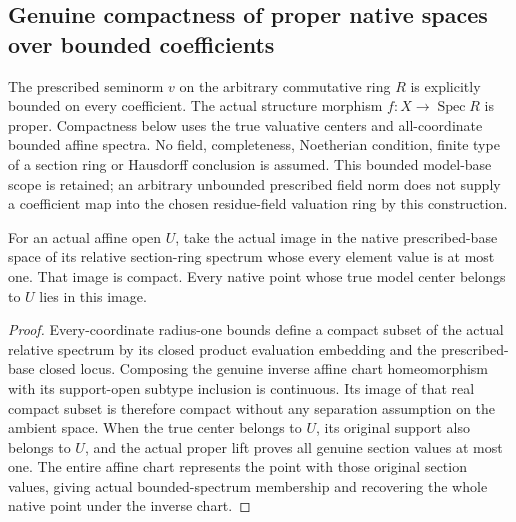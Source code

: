 \subsection{Genuine compactness of proper native spaces over bounded coefficients}
\label{subsec:proper-native-compactness}

The prescribed seminorm $v$ on the arbitrary commutative ring $R$ is
explicitly bounded on every coefficient. The actual structure morphism
$f:X\to\operatorname{Spec}R$ is proper. Compactness below uses the true
valuative centers and all-coordinate bounded affine spectra. No field,
completeness, Noetherian condition, finite type of a section ring or
Hausdorff conclusion is assumed. This bounded model-base scope is retained;
an arbitrary unbounded prescribed field norm does not supply a coefficient
map into the chosen residue-field valuation ring by this construction.

\begin{lemma}
\label{scheme:compact-bounded-native-affine-images}
\leanok
{}
For an actual affine open $U$, take the actual image in the native
prescribed-base space of its relative section-ring spectrum whose every
element value is at most one. That image is compact. Every native point
whose true model center belongs to $U$ lies in this image.
\end{lemma}
\begin{proof}
Every-coordinate radius-one bounds define a compact subset of the actual
relative spectrum by its closed product evaluation embedding and the
prescribed-base closed locus. Composing the genuine inverse affine chart
homeomorphism with its support-open subtype inclusion is continuous.
Its image of that real compact subset is therefore compact without any
separation assumption on the ambient space. When the true center belongs
to $U$, its original support also belongs to $U$, and the actual proper
lift proves all genuine section values at most one. The entire affine
chart represents the point with those original section values, giving
actual bounded-spectrum membership and recovering the whole native point
under the inverse chart.
\end{proof}

